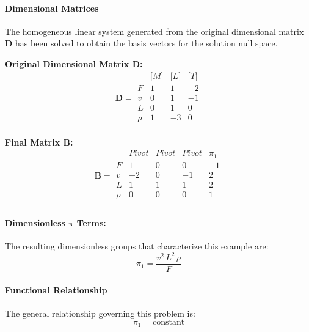                 \paragraph{Dimensional Matrices}
                The homogeneous linear system generated from the original dimensional matrix $\mathbf{D}$ has been solved to obtain the basis vectors for the solution null space.

                \textbf{Original Dimensional Matrix $\mathbf{D}$:}
                \[\mathbf{D} = \begin{array}{r|rrr}
                & \text{[}M\text{]} & \text{[}L\text{]} & \text{[}T\text{]} \\
                \hline
                F & 1 & 1 & -2 \\
v & 0 & 1 & -1 \\
L & 0 & 1 & 0 \\
\rho & 1 & -3 & 0 \\

                \end{array}\]


        \textbf{Final Matrix $\mathbf{B}$:}
        \[\mathbf{B} = \begin{array}{r|rrrr}
        & Pivot & Pivot & Pivot & \pi_{1} \\
        \hline
        F & 1 & 0 & 0 & -1 \\
v & -2 & 0 & -1 & 2 \\
L & 1 & 1 & 1 & 2 \\
\rho & 0 & 0 & 0 & 1 \\

        \end{array}\]

        \paragraph{Dimensionless $\pi$ Terms: }
        The resulting dimensionless groups that characterize this example are:
\begin{equation}
\pi_{1} = \frac{v^{2} \, L^{2} \, \rho}{F}
\end{equation}

                    \paragraph{Functional Relationship}
                    The general relationship governing this problem is:
                    \begin{equation}
                    \pi_1 = \text{constant}
                    \end{equation}

